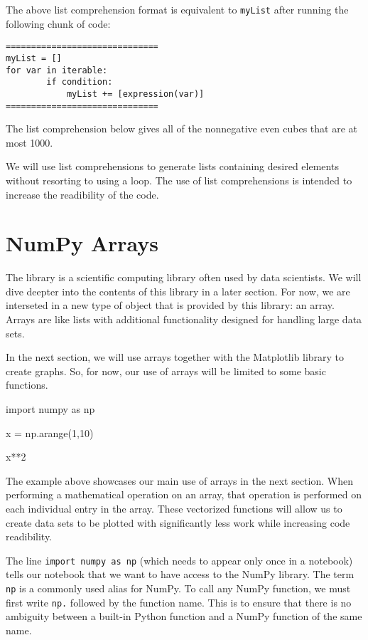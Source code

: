 \documentclass{ximera}
\begin{document}
The above list comprehension format is equivalent to \verb|myList| after running the following chunk of code:

\begin{verbatim}
==============================
myList = []
for var in iterable:
        if condition:
        	myList += [expression(var)]
==============================
\end{verbatim}

The list comprehension below gives all of the nonnegative even cubes that are at most 1000.


We will use list comprehensions to generate lists containing desired elements without resorting to using a loop. The use of list comprehensions is intended to increase the readibility of the code.

\section{NumPy Arrays}

The  library is a scientific computing library often used by data scientists. We will dive deepter into the contents of this library in a later section. For now, we are interseted in a new type of object that is provided by this library: an array. Arrays are like lists with additional functionality designed for handling large data sets. 

In the next section, we will use arrays together with the Matplotlib library to create graphs. So, for now, our use of arrays will be limited to some basic functions.

\begin{sageCell}
import numpy as np

x = np.arange(1,10)

x**2
\end{sageCell}

The example above showcases our main use of arrays in the next section. When performing a mathematical operation on an array, that operation is performed on each individual entry in the array. These vectorized functions will allow us to create data sets to be plotted with significantly less work while increasing code readibility.

The line \verb|import numpy as np| (which needs to appear only once in a notebook) tells our notebook that we want to have access to the NumPy library. The term \verb|np| is a commonly used alias for NumPy. To call any NumPy function, we must first write \verb|np.| followed by the function name. This is to ensure that there is no ambiguity between a built-in Python function and a NumPy function of the same name.
\end{document}
